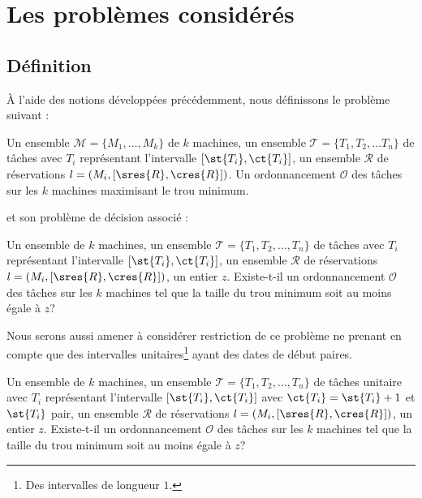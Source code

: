 \section{Les problèmes considérés}

\subsection{Définition}
\label{def_pb}

À l'aide des notions développées précédemment, nous définissons le problème suivant :

\dfopt{\fisched}
{Un ensemble $\mathcal{M} = \{M_1, \dots, M_k\}$ de $k$ machines, un ensemble $\mathcal{T} = \{T_1,
    T_2, \dots T_n\}$ de tâches avec $T_i$ représentant l'intervalle $[\st{T_i}, \ct{T_i}]$, un
ensemble $\mathcal{R}$ de réservations $l = (M_i, [\sres{R}, \cres{R}])$.} 
{Un ordonnancement $\mathcal{O}$ des tâches sur les $k$ machines maximisant le trou
minimum.}

et son problème de décision associé :

\dfdec{\fischedpi{}}
{Un ensemble de $k$ machines, un ensemble $\mathcal{T} = \{T_1, T_2, \dots, T_n\}$ de tâches avec
    $T_i$ représentant l'intervalle $[\st{T_i}, \ct{T_i}]$, un ensemble $\mathcal{R}$ de
réservations $l = (M_i, [\sres{R}, \cres{R}])$, un entier $z$.}
{Existe-t-il un ordonnancement $\mathcal{O}$ des tâches sur les $k$ machines tel que la taille du
trou minimum soit au moins égale à $z$?}

Nous serons aussi amener à considérer restriction de ce problème ne prenant en compte que des
intervalles unitaires\footnote{Des intervalles de longueur $1$.} ayant des dates de début paires.

\dfdec[unitfischedpi]{\unitfischedpi{}}
{Un ensemble de $k$ machines, un ensemble $\mathcal{T} = \{T_1, T_2, \dots, T_n\}$ de tâches
unitaire avec $T_i$ représentant l'intervalle $[\st{T_i}, \ct{T_i}]$ avec $\ct{T_i} = \st{T_i} +
1$ et $\st{T_i}$ pair, un ensemble $\mathcal{R}$ de réservations $l = (M_i, [\sres{R}, \cres{R}])$,
un entier $z$.}
{Existe-t-il un ordonnancement $\mathcal{O}$ des tâches sur les $k$ machines tel que la taille du
trou minimum soit au moins égale à $z$?}



